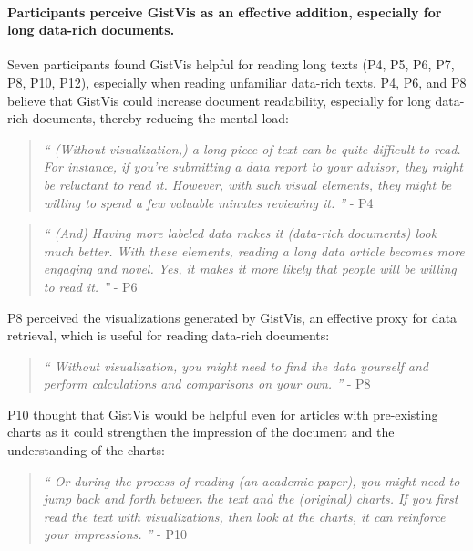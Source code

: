 \paragraph{Participants perceive GistVis as an effective addition, especially for long data-rich documents.}
Seven participants found GistVis helpful for reading long texts (P4, P5, P6, P7, P8, P10, P12), especially when reading unfamiliar data-rich texts. P4, P6, and P8 believe that GistVis could increase document readability, especially for long data-rich documents, thereby reducing the mental load:
\begin{quote}
\textit{``
(Without visualization,) a long piece of text can be quite difficult to read. For instance, if you're submitting a data report to your advisor, they might be reluctant to read it. However, with such visual elements, they might be willing to spend a few valuable minutes reviewing it.
    ''} - P4
\end{quote}
\begin{quote}
\textit{``
(And) Having more labeled data makes it (data-rich documents) look much better. With these elements, reading a long data article becomes more engaging and novel. Yes, it makes it more likely that people will be willing to read it.
    ''} - P6
\end{quote}
P8 perceived the visualizations generated by GistVis, an effective proxy for data retrieval, which is useful for reading data-rich documents:
\begin{quote}
\textit{``
Without visualization, you might need to find the data yourself and perform calculations and comparisons on your own.
    ''} - P8
\end{quote}
P10 thought that GistVis would be helpful even for articles with pre-existing charts as it could strengthen the impression of the document and the understanding of the charts:
\begin{quote}
\textit{``
Or during the process of reading (an academic paper), you might need to jump back and forth between the text and the (original) charts. If you first read the text with visualizations, then look at the charts, it can reinforce your impressions.
    ''} - P10
\end{quote}


